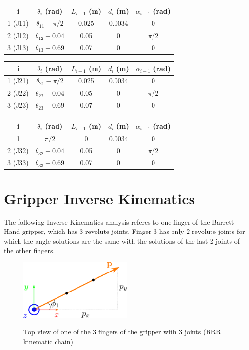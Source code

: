 \begin{center}
\begin{tabular}{ |c|c|c|c|c| } 
\hline
i & $θ_i$ (rad) & $L_{i-1}$ (m) & $d_i$ (m) & $α_{i-1}$ (rad) \\
\hline
1 (J11) & $θ_{11} - π/2$ & 0.025 & 0.0034 & 0 \\
2 (J12) & $θ_{12} + 0.04$ & 0.05 & 0 & $π/2$ \\
3 (J13) & $θ_{13} + 0.69$ & 0.07 & 0 & 0 \\
\hline
\end{tabular}
\end{center}

\begin{center}
\begin{tabular}{ |c|c|c|c|c| } 
\hline
i & $θ_i$ (rad) & $L_{i-1}$ (m) & $d_i$ (m) & $α_{i-1}$ (rad) \\
\hline
1 (J21) & $θ_{21} - π/2$ & 0.025 & 0.0034 & 0 \\
2 (J22) & $θ_{22} + 0.04$ & 0.05 & 0 & $π/2$ \\
3 (J23) & $θ_{23} + 0.69$ & 0.07 & 0 & 0 \\
\hline
\end{tabular}
\end{center}

\begin{center}
\begin{tabular}{ |c|c|c|c|c| } 
\hline
i & $θ_i$ (rad) & $L_{i-1}$ (m) & $d_i$ (m) & $α_{i-1}$ (rad) \\
\hline
1 & $π/2$ & 0 & 0.0034 & 0 \\
2 (J32) & $θ_{32} + 0.04$ & 0.05 & 0 & $π/2$ \\
3 (J33) & $θ_{33} + 0.69$ & 0.07 & 0 & 0 \\
\hline
\end{tabular}
\end{center}


\section{Gripper Inverse Kinematics}

The following Inverse Kinematics analysis referes to one finger of the Barrett Hand gripper, which has 3 revolute joints. Finger 3 has only 2 
revolute joints for which the angle solutions are the same with the solutions of the last 2 joints of the other fingers. 


\begin{center}
\begin{figure}[H]
\centering
\includegraphics[width=0.5\textwidth]{images/grasper-rrr-top.png}\\
\caption{Top view of one of the 3 fingers of the gripper with 3 joints (RRR kinematic chain)}
\label{grasper-rrr-top}
\end{figure}
\end{center}

